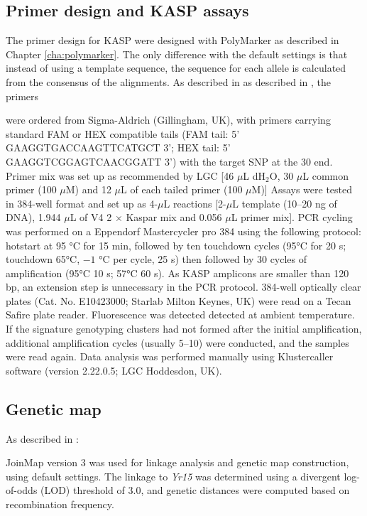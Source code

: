 \subsection{Primer design and KASP assays}
The primer design for KASP were designed with PolyMarker as described in Chapter \ref{cha:polymarker}. 
The only difference with the default settings is that instead of using a template sequence, the sequence for each allele is calculated from the consensus of the alignments. 
As described in as described in \citet{Ramirez-Gonzalez2015b}, the primers 
\begin{blockquote} were ordered from Sigma-Aldrich (Gillingham, UK), with primers carrying standard FAM or HEX compatible tails (FAM tail: 5' GAAGGTGACCAAGTTCATGCT 3'; HEX tail: 5' GAAGGTCGGAGTCAACGGATT 3') with the target SNP at the 30 end. 
Primer mix was set up as recommended by LGC [46 $\mu$L dH$_{2}$O, 30 $\mu$L common primer (100 $\mu$M) and 12 $\mu$L of each tailed primer (100 $\mu$M)] \citep{LGC}
Assays were tested in 384-well format and set up as 4-$\mu$L reactions [2-$\mu$L template (10–20 ng of DNA), 1.944 $\mu$L of V4 2 $\times$ Kaspar mix and 0.056 $\mu$L primer mix]. 
PCR cycling was performed on a Eppendorf Mastercycler pro 384 using the following protocol: hotstart at 95 °C for 15 min, followed by ten touchdown cycles (95°C for 20 s; touchdown 65°C, $-1$ °C per cycle, 25 s) then followed by 30 cycles of amplification (95°C 10 s; 57°C 60 s).
As KASP amplicons are smaller than 120 bp, an extension step is unnecessary in the PCR protocol. 384-well optically clear plates (Cat. No. E10423000; Starlab Milton Keynes, UK) were read on a Tecan Safire plate reader. 
Fluorescence was detected detected at ambient temperature. If the signature genotyping clusters had not formed after the initial amplification, additional amplification cycles (usually 5–10) were conducted, and the samples were read again. Data analysis was performed manually using Klustercaller software (version 2.22.0.5; LGC Hoddesdon, UK).
\end{blockquote}


\subsection{Genetic map}
As described in \citet{Ramirez-Gonzalez2015b}:
\begin{blockquote}
 JoinMap version 3 \citep{vanOoijen2002} was used for linkage analysis and genetic map construction, using default settings. The linkage to \textit{Yr15} was determined using a divergent log-of-odds (LOD) threshold of 3.0, and genetic distances were computed based on recombination frequency. 
\end{blockquote}

